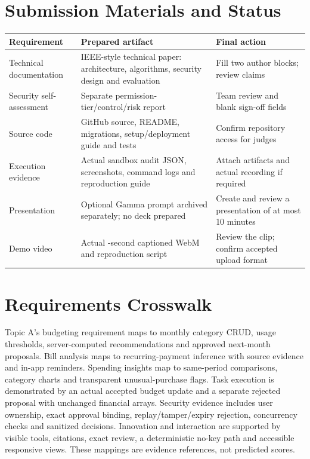 \documentclass[conference,onecolumn,a4paper]{IEEEtran}
\begin{document}
\section{Submission Materials and Status}
\noindent\begin{tabularx}{\textwidth}{L{35mm}L{73mm}X}
\toprule Requirement & Prepared artifact & Final action\\\midrule
Technical documentation & IEEE-style technical paper: architecture, algorithms, security design and evaluation & Fill two author blocks; review claims\\[2mm]
Security self-assessment & Separate permission-tier/control/risk report & Team review and blank sign-off fields\\[2mm]
Source code & GitHub source, README, migrations, setup/deployment guide and tests & Confirm repository access for judges\\[2mm]
Execution evidence & Actual sandbox audit JSON, screenshots, command logs and reproduction guide & Attach artifacts and actual recording if required\\[2mm]
Presentation & Optional Gamma prompt archived separately; no deck prepared & Create and review a presentation of at most 10 minutes\\[2mm]
Demo video & Actual \DemoSeconds{}-second captioned WebM and reproduction script & Review the clip; confirm accepted upload format\\
\bottomrule
\end{tabularx}

\section{Requirements Crosswalk}
Topic A's budgeting requirement maps to monthly category CRUD, usage thresholds, server-computed recommendations and approved next-month proposals. Bill analysis maps to recurring-payment inference with source evidence and in-app reminders. Spending insights map to same-period comparisons, category charts and transparent unusual-purchase flags. Task execution is demonstrated by an actual accepted budget update and a separate rejected proposal with unchanged financial arrays. Security evidence includes user ownership, exact approval binding, replay/tamper/expiry rejection, concurrency checks and sanitized decisions. Innovation and interaction are supported by visible tools, citations, exact review, a deterministic no-key path and accessible responsive views. These mappings are evidence references, not predicted scores.
\end{document}
